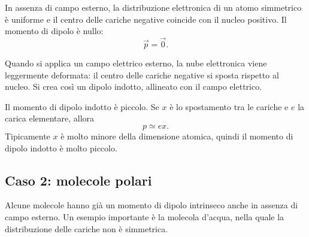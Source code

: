 \documentclass[a4paper]{article}
\begin{document}
In assenza di campo esterno, la distribuzione elettronica di un atomo simmetrico è uniforme e il centro delle cariche negative coincide con il nucleo positivo. Il momento di dipolo è nullo:
\[
    \vec{p}=\vec{0}.
\]

Quando si applica un campo elettrico esterno, la nube elettronica viene leggermente deformata: il centro delle cariche negative si sposta rispetto al nucleo. Si crea così un dipolo indotto, allineato con il campo elettrico.

\begin{center}
\end{center}

Il momento di dipolo indotto è piccolo. Se \(x\) è lo spostamento tra le cariche e \(e\) la carica elementare, allora
\[
    p\simeq ex.
\]
Tipicamente \(x\) è molto minore della dimensione atomica, quindi il momento di dipolo indotto è molto piccolo.

\subsection{Caso 2: molecole polari}

Alcune molecole hanno già un momento di dipolo intrinseco anche in assenza di campo esterno. Un esempio importante è la molecola d'acqua, nella quale la distribuzione delle cariche non è simmetrica.

\begin{center}
\end{center}
\end{document}
